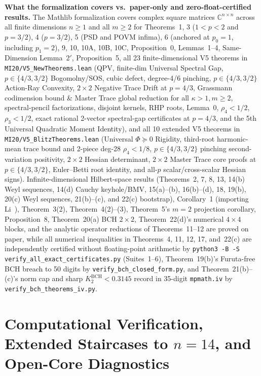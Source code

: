 \documentclass[10pt,letterpaper]{article}
\newcommand{\C}{\mathbb{C}}
\begin{document}
\textbf{What the formalization covers vs.\ paper-only and zero-float-certified results.}
The Mathlib formalization covers complex square matrices $\C^{n\times n}$ across all finite dimensions $n \ge 1$ and all $m \ge 2$ for Theorems~1, 3 ($1<p<2$ and $p=3/2$), 4 ($p=3/2$), 5 (PSD and POVM infima), 6 (anchored at $p_0 = 1$, including $p_1 = 2$), 9, 10, 10A, 10B, 10C, Proposition~0, Lemmas~1--4, Same-Dimension Lemma~2$'$, Proposition~5, all 23 finite-dimensional V5 theorems in \texttt{MI20/V5\_NewTheorems.lean} (QPV, finite-dim Universal Spectral Gap, $p \in \{4/3, 3/2\}$ Bogomolny/SOS, cubic defect, degree-4/6 pinching, $p \in \{4/3, 3/2\}$ Action-Ray Convexity, $2\times 2$ Negative Trace Drift at $p = 4/3$, Grassmann codimension bound \& Master Trace global reduction for all $\kappa > 1, m \ge 2$, spectral-pencil factorizations, disjoint kernels, RHP roots, Lemma~0, $\rho_4 < 1/2$, $\rho_3 < 1/2$, exact rational 2-vector spectral-gap certificates at $p = 4/3$, and the 5th Universal Quadratic Moment Identity), and all 10 extended V5 theorems in \texttt{MI20/V5\_BlitzTheorems.lean} (Universal $\Phi \succeq 0$ Rigidity, third-root harmonic-mean trace bound and 2-piece deg-28 $\rho_4 < 1/8$, $p \in \{4/3, 3/2\}$ pinching second-variation positivity, $2\times 2$ Hessian determinant, $2\times 2$ Master Trace core proofs at $p \in \{4/3, 3/2\}$, Euler--Betti root identity, and all-$p$ scalar/cross-scalar Hessian signs). Infinite-dimensional Hilbert-space results (Theorems~2, 7, 8, 13, 14(b) Weyl sequences, 14(d) Cauchy keyhole/BMV, 15(a)--(b), 16(b)--(d), 18, 19(b), 20(c) Weyl sequences, 21(b)--(c), and 22(c) bootstrap), Corollary~1 (importing Li~\cite{Li2026}), Theorem~3(2), Theorem~4(2)--(3), Theorem~5's $m=2$ projection corollary, Proposition~8, Theorem~20(a) BCH $2\times 2$, Theorem~22(d)'s numerical $4\times 4$ blocks, and the analytic operator reductions of Theorems~11--12 are proved on paper, while all numerical inequalities in Theorems~4, 11, 12, 17, and~22(c) are independently certified without floating-point arithmetic by \texttt{python3 -B -S verify\_all\_exact\_certificates.py} (Suites~1--6), Theorem~19(b)'s Furuta-free BCH breach to 50 digits by \texttt{verify\_bch\_closed\_form.py}, and Theorem~21(b)--(c)'s norm cap and sharp $K_2^{\mathrm{BCH}} < 0.3145$ record in 35-digit \texttt{mpmath.iv} by \texttt{verify\_bch\_theorems\_iv.py}.

\section{Computational Verification, Extended Staircases to \texorpdfstring{$n = 14$}{n = 14}, and Open-Core Diagnostics}
\end{document}
